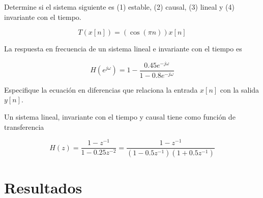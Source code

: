 \documentclass[addpoints]{exam}
\begin{document}
\begin{questions}
\question[20]
Determine si el sistema siguiente es (1) estable, (2) causal, (3) lineal y (4) invariante con el tiempo.

$$T(x[n]) = (\cos(\pi n))x[n]$$
\newpage

\question[20]
La respuesta en frecuencia de un sistema lineal e invariante con el tiempo es

$$H\left(e^{j\omega}\right) = 1 - \frac{0.45 e^{-j\omega}}{1 - 0.8 e^{-j\omega}}$$

Especifique la ecuación en diferencias que relaciona la entrada $x[n]$ con la salida $y[n]$.


\question[60]
Un sistema lineal, invariante con el tiempo y causal tiene como función de transferencia

$$H(z) = \frac{1-z^{-1}}{1- 0.25 z^{-2}} = \frac{1-z^{-1}}{\left(1- 0.5 z^{-1}\right)\left(1+0.5 z^{-1}\right)}$$



\end{questions}

\section*{Resultados}

\begin{center}
\gradetable[v][questions]
\end{center}


\footrule
{}
\end{document}
